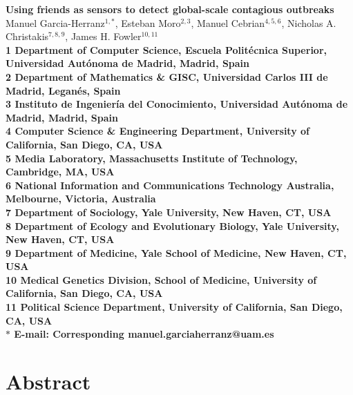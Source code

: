 

\begin{flushleft}
{\Large
\textbf{Using friends as sensors to detect global-scale contagious outbreaks}
}
\\
Manuel Garcia-Herranz$^{1,\ast}$, 
Esteban Moro$^{2,3}$, 
Manuel Cebrian$^{4,5,6}$,
Nicholas A. Christakis$^{7,8,9}$,
James H. Fowler$^{10,11}$
\\
\bf{1} Department of Computer Science, Escuela Polit\'ecnica Superior, Universidad Aut\'onoma de Madrid,  Madrid, Spain
\\
\bf{2} Department of Mathematics \& GISC, Universidad Carlos III de Madrid, Legan\'es, Spain
\\
\bf{3} Instituto de Ingenier\'ia del Conocimiento, Universidad Aut\'onoma de Madrid, Madrid, Spain
\\
\bf{4} Computer Science \& Engineering Department, University of California, San Diego, CA, USA
\\
\bf{5} Media Laboratory, Massachusetts Institute of Technology, Cambridge, MA, USA
\\
\bf{6} National Information and Communications Technology Australia, Melbourne, Victoria, Australia
\\
\bf{7} Department of Sociology, Yale University, New Haven, CT, USA
\\
\bf{8} Department of Ecology and Evolutionary Biology, Yale University, New Haven, CT, USA
\\
\bf{9} Department of Medicine, Yale School of Medicine, New Haven, CT, USA
\\
\bf{10} Medical Genetics Division, School of Medicine, University of California, San Diego, CA, USA
\\
\bf{11} Political Science Department, University of California, San Diego, CA, USA
\\

$\ast$ E-mail: Corresponding manuel.garciaherranz@uam.es
\end{flushleft}

\section*{Abstract}

